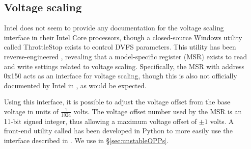 \subsection{Voltage scaling}

Intel does not seem to provide any documentation for the voltage
scaling interface in their Intel Core processors, though a closed-source
Windows utility called ThrottleStop \cite{throttlestop} exists to control DVFS
parameters. This utility has been reverse-engineered \cite{elersicDoc},
revealing that a model-specific register (MSR) exists to read and write settings
related to voltage scaling. Specifically, the MSR with address 0x150 acts as an
interface for voltage scaling, though this is also not officially documented by
Intel in \cite[Volume 4, §2.13]{intelDevManual}, as would be expected.

Using this interface, it is possible to adjust the voltage offset from the base
voltage in units of $\frac{1}{1024}$ volts. The voltage offset number used by
the MSR is an 11-bit signed integer, thus allowing a maximum voltage offset of
$\pm{1}$ volts. A front-end utility called  \cite{whewellUndervolt}
has been developed in Python to more easily use the interface described in
\cite{elersicDoc}. We use  in §\ref{sec:unstableOPPs}.
